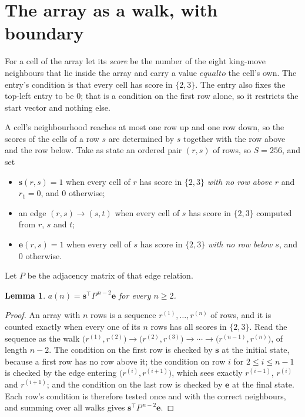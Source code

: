 \documentclass[11pt,a4paper]{article}
\theoremstyle{plain}
\newtheorem{lemma}[theorem]{Lemma}
\theoremstyle{definition}
\begin{document}
\section{The array as a walk, with boundary}

For a cell of the array let its \emph{score} be the number of the eight king-move neighbours that lie inside
the array and carry a value $equal to$ the cell's own. The entry's condition is that every cell
has score in $\{2,3\}$. The entry also fixes the top-left entry to be $0$; that is a condition on the first row alone, so it restricts the start vector and nothing else.

A cell's neighbourhood reaches at most one row up and one row down, so the scores of the
cells of a row $s$ are determined by $s$ together with the row above and the row below.
Take as state an ordered pair $(r,s)$ of rows, so $S=256$, and set
\begin{itemize}
\item $\mathbf{s}(r,s)=1$ when every cell of $r$ has score in $\{2,3\}$ \emph{with no row
above $r$} and $r_1=0$, and $0$ otherwise;
\item an edge $(r,s)\to(s,t)$ when every cell of $s$ has score in $\{2,3\}$ computed from
$r$, $s$ and $t$;
\item $\mathbf{e}(r,s)=1$ when every cell of $s$ has score in $\{2,3\}$ \emph{with no row
below $s$}, and $0$ otherwise.
\end{itemize}
Let $P$ be the adjacency matrix of that edge relation.

\begin{lemma}\label{lem:walk}
$a(n)=\mathbf{s}^{\!\top}P^{\,n-2}\mathbf{e}$ for every $n\ge2$.
\end{lemma}

\begin{proof}
An array with $n$ rows is a sequence $r^{(1)},\dots,r^{(n)}$ of rows, and it is counted
exactly when every one of its $n$ rows has all scores in $\{2,3\}$. Read the sequence as the
walk $\bigl(r^{(1)},r^{(2)}\bigr)\to\bigl(r^{(2)},r^{(3)}\bigr)\to\cdots\to
\bigl(r^{(n-1)},r^{(n)}\bigr)$, of length $n-2$. The condition on the first row is
checked by $\mathbf{s}$ at the initial state, because a first row has no row above it; the
condition on row $i$ for $2\le i\le n-1$ is checked by the edge entering
$\bigl(r^{(i)},r^{(i+1)}\bigr)$, which sees exactly $r^{(i-1)}$, $r^{(i)}$ and
$r^{(i+1)}$; and the condition on the last row is checked by $\mathbf{e}$ at the final
state. Each row's condition is therefore tested once and with the correct neighbours, and
summing over all walks gives $\mathbf{s}^{\!\top}P^{\,n-2}\mathbf{e}$.
\end{proof}
\end{document}
